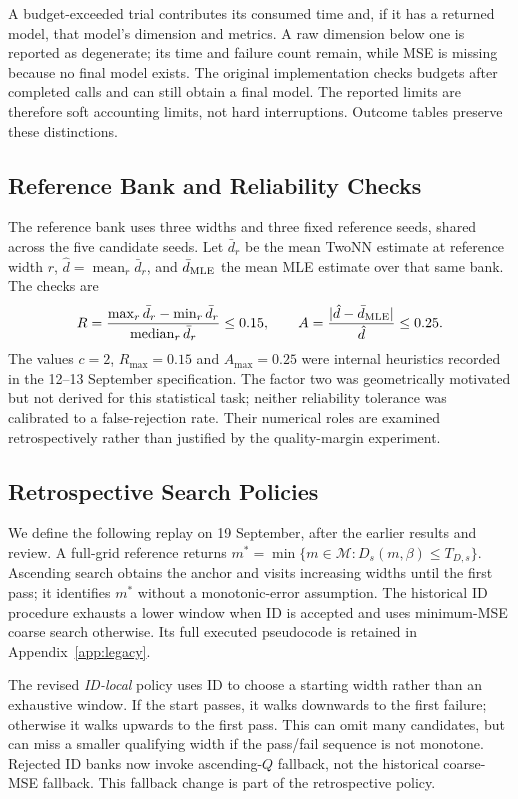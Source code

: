 \documentclass[make,article,submit,pdftex,moreauthors]{Definitions/mdpi}
\begin{document}
A budget-exceeded trial contributes its consumed time and, if it has a
returned model, that model's dimension and metrics. A raw dimension below
one is reported as degenerate; its time and failure count remain, while
MSE is missing because no final model exists. The original implementation
checks budgets after completed calls and can still obtain a final model.
The reported limits are therefore soft accounting limits, not hard
interruptions. Outcome tables preserve these distinctions.

\subsection{Reference Bank and Reliability Checks}\label{sec:algorithm}
The reference bank uses three widths and
three fixed reference seeds, shared across the five candidate seeds.
Let $\bar d_r$ be the mean TwoNN estimate at reference width $r$,
$\hat d=\operatorname{mean}_r\bar d_r$, and $\bar d_{\rm MLE}$ the mean
MLE estimate over that same bank. The checks are
\begin{equation}
 R=\frac{\max_r\bar d_r-\min_r\bar d_r}{\operatorname{median}_r\bar d_r}
 \le0.15,\qquad
 A=\frac{|\hat d-\bar d_{\rm MLE}|}{\hat d}\le0.25.
 \label{eq:checks}
\end{equation}
The values $c=2$, $R_{\max}=0.15$ and $A_{\max}=0.25$ were internal
heuristics recorded in the 12--13 September specification. The factor
two was geometrically motivated but not derived for this statistical
task; neither reliability tolerance was calibrated to a false-rejection
rate. Their numerical roles are examined retrospectively rather than
justified by the quality-margin experiment.

\subsection{Retrospective Search Policies}\label{sec:replay}
We define the following replay on 19 September, after the earlier
results and review. A full-grid reference returns
$m^*=\min\{m\in\mathcal M:D_s(m,\beta)\le T_{D,s}\}$.
Ascending search obtains the anchor and visits increasing widths until
the first pass; it identifies $m^*$ without a monotonic-error assumption.
The historical ID procedure exhausts a lower window when ID is accepted
and uses minimum-MSE coarse search otherwise. Its full executed
pseudocode is retained in Appendix~\ref{app:legacy}.

The revised \emph{ID-local} policy uses ID to choose a starting width
rather than an exhaustive window. If the start passes, it walks
downwards to the first failure; otherwise it walks upwards to the first
pass. This can omit many candidates, but can miss a smaller qualifying
width if the pass/fail sequence is not monotone. Rejected ID banks now
invoke ascending-$Q$ fallback, not the historical coarse-MSE fallback.
This fallback change is part of the retrospective policy.
\end{document}
